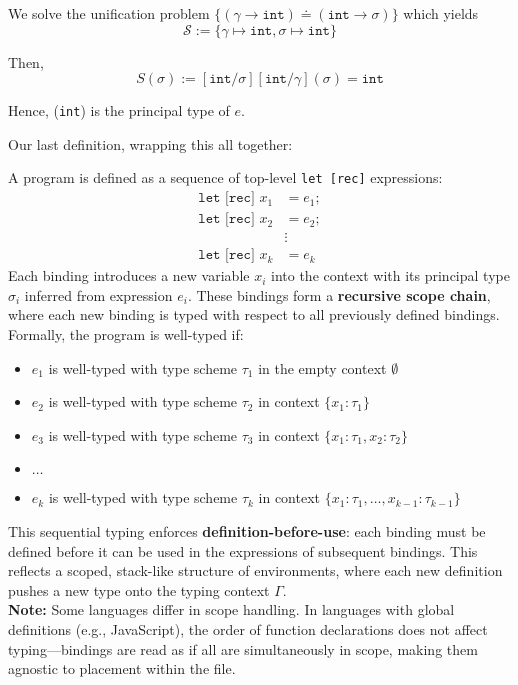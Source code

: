 \begin{Example}
    \vspace{1em}
    \noindent
    We solve the unification problem $\{(\gamma\to\texttt{int})\doteq (\texttt{int}\to\sigma)\}$ which yields\\
    $$\mathcal{S}:=\{\gamma\mapsto\texttt{int},\sigma\mapsto\texttt{int}\}$$
    
    \noindent
    Then, 
    $$S(\sigma):=[\texttt{int}/\sigma][\texttt{int}/\gamma](\sigma)=\texttt{int}$$
    
    \noindent
    Hence, (\texttt{int}) is the principal type of $e$. 
  \end{Example}
  
  \newpage 

\noindent
Our last definition, wrapping this all together:

\begin{Def}
  
    A program is defined as a sequence of top-level \texttt{let [rec]} expressions:
\begin{align*}
    \texttt{let [rec] } x_1 &= e_1;\\
    \texttt{let [rec] } x_2 &= e_2;\\
    &\vdots\\
    \texttt{let [rec] } x_k &= e_k
\end{align*}
Each binding introduces a new variable $x_i$ into the context with its principal type $\sigma_i$ inferred 
from expression $e_i$. These bindings form a \textbf{recursive scope chain}, where each new binding is typed with respect to all previously defined bindings.\\

\noindent
Formally, the program is well-typed if:
\begin{itemize}
    \item $e_1$ is well-typed with type scheme $\tau_1$ in the empty context $\emptyset$
    \item $e_2$ is well-typed with type scheme $\tau_2$ in context $\{x_1 : \tau_1\}$
    \item $e_3$ is well-typed with type scheme $\tau_3$ in context $\{x_1 : \tau_1, x_2 : \tau_2\}$
    \item $\dots$
    \item $e_k$ is well-typed with type scheme $\tau_k$ in context $\{x_1 : \tau_1, \dots, x_{k-1} : \tau_{k-1}\}$
\end{itemize}

\noindent
This sequential typing enforces \textbf{definition-before-use}: each binding must be defined before it can be used in the expressions of subsequent bindings. This reflects a scoped, stack-like structure of environments, 
where each new definition pushes a new type onto the typing context $\Gamma$.\\

\noindent
\textbf{Note:} Some languages differ in scope handling. In languages with global definitions (e.g., JavaScript), the order of function declarations does not affect typing---bindings are read as if all are simultaneously in scope, making them agnostic to placement within the file.
\end{Def}